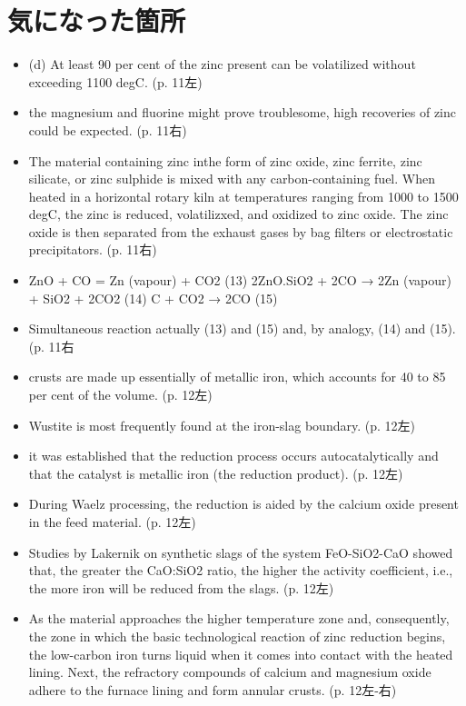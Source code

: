 \documentclass[a4j]{jsarticle}
\begin{document}
\section{気になった箇所}
\begin{itemize}
\item
  (d) At least 90 per cent of the zinc present can be volatilized without exceeding 1100 degC. (p. 11左)
\item
  the magnesium and fluorine might prove troublesome, high recoveries of zinc could be expected. (p. 11右)
\item
  The material containing zinc inthe form of zinc oxide, zinc ferrite, zinc silicate, or zinc sulphide is mixed with any carbon-containing fuel. When heated in a horizontal rotary kiln at temperatures ranging from 1000 to 1500 degC, the zinc is reduced, volatilizxed, and oxidized to zinc oxide. The zinc oxide is then separated from the exhaust gases by bag filters or electrostatic precipitators.
(p. 11右)
\item
  ZnO + CO = Zn (vapour) + CO2 (13)\newline
  2ZnO.SiO2 + 2CO → 2Zn (vapour) + SiO2 + 2CO2 (14)\newline
  C + CO2 → 2CO (15)\newline
\item
  Simultaneous reaction actually (13) and (15) and, by analogy, (14) and (15). (p. 11右
\item
  crusts are made up essentially of metallic iron, which accounts for 40 to 85 per cent of the volume. (p. 12左)
\item
  Wustite is most frequently found at the iron-slag boundary. (p. 12左)
\item
  it was established that the reduction process occurs autocatalytically and that the catalyst is metallic iron (the reduction product). (p. 12左)
\item
  During Waelz processing, the reduction is aided by the calcium oxide present in the feed material. (p. 12左)
\item
  Studies by Lakernik on synthetic slags of the system FeO-SiO2-CaO showed that, the greater the CaO:SiO2 ratio, the higher the activity coefficient, i.e., the more iron will be reduced from the slags. (p. 12左)
\item
  As the material approaches the higher temperature zone and, consequently, the zone in which the basic technological reaction of zinc reduction begins, the low-carbon iron turns liquid when it comes into contact with the heated lining. Next, the refractory compounds of calcium and magnesium oxide adhere to the furnace lining and form annular crusts. (p. 12左-右)

\end{itemize}
\end{document}
